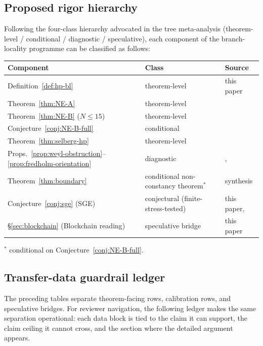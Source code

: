 \documentclass[11pt]{article}
\theoremstyle{definition}
\theoremstyle{remark}
\begin{document}
\subsection{Proposed rigor hierarchy}
\label{sec:rigor}

Following the four-class hierarchy advocated in the tree meta-analysis
(theorem-level / conditional / diagnostic / speculative), each
component of the branch-locality programme can be classified as
follows:

\begin{center}
\begin{tabular}{@{}lll@{}}
\toprule
Component & Class & Source \\
\midrule
Definition~\ref{def:hp-bl} & theorem-level & this paper \\
Theorem~\ref{thm:NE-A} & theorem-level & \cite{Geiger2026RHII} \\
Theorem~\ref{thm:NE-B} ($N\leq 15$) & theorem-level & \cite{Geiger2026RHII} \\
Conjecture~\ref{conj:NE-B-full} & conditional & \cite{Geiger2026RHII} \\
Theorem~\ref{thm:selberg-hp} & theorem-level & \cite{Selberg1956} \\
Props.~\ref{prop:weyl-obstruction}--\ref{prop:fredholm-orientation} & diagnostic & \cite{Geiger2026RHIII}, \cite{MobiusGradedPrimeHub} \\
Theorem~\ref{thm:boundary} & conditional non-constancy theorem${}^*$ & synthesis \\
Conjecture~\ref{conj:sge} (SGE) & conjectural (finite-stress-tested) & this paper, \cite{SGENote} \\
\S\ref{sec:blockchain} (Blockchain reading) & speculative bridge & this paper \\
\bottomrule
\end{tabular}
\end{center}
${}^*$ conditional on Conjecture~\ref{conj:NE-B-full}.

\subsection{Transfer-data guardrail ledger}
\label{sec:transfer-data-ledger}

The preceding tables separate theorem-facing rows, calibration rows,
and speculative bridges. For reviewer navigation, the following ledger
makes the same separation operational: each data block is tied to the
claim it can support, the claim ceiling it cannot cross, and the section
where the detailed argument appears.
\end{document}
